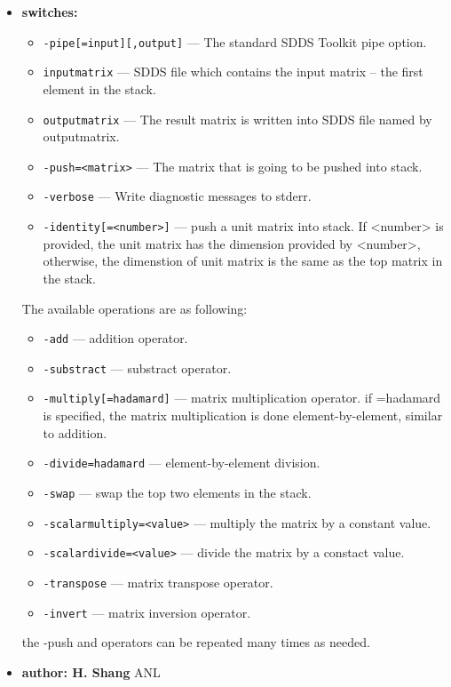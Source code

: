 \begin{itemize}
\item {\bf switches:}
%
%
    \begin{itemize}
    \item {\tt  -pipe[=input][,output]} --- The standard SDDS Toolkit pipe option.
    \item {\tt  inputmatrix}    --- SDDS file which contains the input matrix -- the first element
                                     in the stack.
    \item {\tt  outputmatrix}   --- The result matrix is written into SDDS file named by outputmatrix.
    \item {\tt  -push=<matrix>}  --- The matrix that is going to be pushed into stack.
    \item {\tt  -verbose}        --- Write diagnostic messages to stderr.
    \item {\tt  -identity[=<number>]} --- push a unit matrix into stack. If {<number>} is provided, the unit matrix has the dimension provided by {<number>}, otherwise, the dimenstion of unit matrix is the same as
the top matrix in the stack.
    \end{itemize}
The available operations are as following:      
    \begin{itemize}
    \item {\tt  -add}       --- addition operator.
    \item {\tt  -substract}  --- substract operator.
    \item {\tt  -multiply[=hadamard]} --- matrix multiplication operator. if =hadamard is specified, the
                matrix multiplication is done element-by-element, similar to addition.
    \item {\tt  -divide=hadamard} --- element-by-element division.
    \item {\tt  -swap}   --- swap the top two elements in the stack.
    \item {\tt  -scalarmultiply=<value>}  --- multiply the matrix by a constant value.
    \item {\tt  -scalardivide=<value>}    --- divide the matrix by a constact value.
    \item {\tt  -transpose} --- matrix transpose operator.
    \item {\tt  -invert}    --- matrix inversion operator.
    \end{itemize}
the -push and operators can be repeated many times as needed.
%
%
%
%
\item {\bf author: H. Shang } ANL
\end{itemize}



